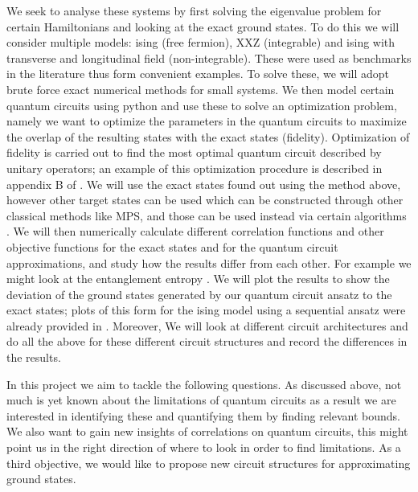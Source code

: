 \documentclass{physics_article}
\begin{document}
	We seek to analyse these systems by first solving the eigenvalue problem for certain Hamiltonians and looking at the exact ground states. To do this we will consider multiple models: ising (free fermion), XXZ (integrable) and ising with transverse and longitudinal field (non-integrable). These were used as benchmarks in the literature \cite{PhysRevResearch.4.L022020,PRXQuantum.2.010342,PhysRevResearch.4.033118} thus form convenient examples. To solve these, we will adopt brute force exact numerical methods for small systems. We then model certain quantum circuits using python and use these to solve an optimization problem, namely we want to optimize the parameters in the quantum circuits to maximize the overlap of the resulting states with the exact states (fidelity). Optimization of fidelity is carried out to find the most optimal quantum circuit described by unitary operators; an example of this optimization procedure is described in appendix B of \cite{PRXQuantum.2.010342}. We will use the exact states found out using the method above, however other target states can be used which can be constructed through other classical methods like MPS, and those can be used instead via certain algorithms \cite{PRXQuantum.2.010342}. We will then numerically calculate different correlation functions and other objective functions for the exact states and for the quantum circuit approximations, and study how the results differ from each other. For example we might look at the entanglement entropy \cite{PhysRevResearch.4.033118}. We will plot the results to show the deviation of the ground states generated by our quantum circuit ansatz to the exact states; plots of this form for the ising model using a sequential ansatz were already provided in \cite{PRXQuantum.2.010342}. Moreover, We will look at different circuit architectures and do all the above for these different circuit structures and record the differences in the results.

	In this project we aim to tackle the following questions. As discussed above, not much is yet known about the limitations of quantum circuits as a result we are interested in identifying these and quantifying them by finding relevant bounds. We also want to gain  new insights of correlations on quantum circuits, this might point us in the right direction of where to look in order to find limitations. As a third objective, we would like to propose new circuit structures for approximating ground states. 

 	
 	
\end{document}
